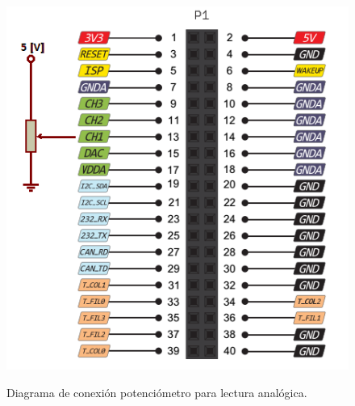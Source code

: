\documentclass[12pt,letterpaper]{article}
\begin{document}
\begin{center}
\begin{figure}[!h]
\centering
\includegraphics[width=6 cm]{figuras/f6.png}\\
\caption{Diagrama de conexión potenciómetro para lectura analógica.}
\label{Fig24}
\end{figure}
\end{center}
\end{document}
